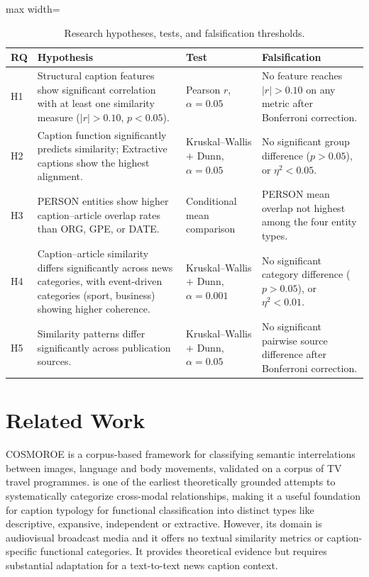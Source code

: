 \documentclass[11pt,a4paper]{article}
\begin{document}
\begin{table}[h]
\centering
\caption{Research hypotheses, tests, and falsification thresholds.}
\label{tab:hypotheses}
\small
\begin{adjustbox}{max width=\linewidth}
\begin{tabular}{@{}lp{5.5cm}p{3.2cm}p{3.2cm}@{}}
\toprule
\textbf{RQ} & \textbf{Hypothesis} & \textbf{Test} & \textbf{Falsification}\\
\midrule
H1 & Structural caption features show significant correlation with at least
     one similarity measure ($|r| > 0.10$, $p < 0.05$).
   & Pearson $r$, $\alpha = 0.05$
   & No feature reaches $|r| > 0.10$ on any metric after Bonferroni correction.\\
\addlinespace
H2 & Caption function significantly predicts similarity; Extractive captions
     show the highest alignment.
   & Kruskal--Wallis $+$ Dunn, $\alpha = 0.05$
   & No significant group difference ($p > 0.05$), or $\eta^2 < 0.05$.\\
\addlinespace
H3 & PERSON entities show higher caption--article overlap rates than ORG,
     GPE, or DATE.
   & Conditional mean comparison
   & PERSON mean overlap not highest among the four entity types.\\
\addlinespace
H4 & Caption--article similarity differs significantly across news categories,
     with event-driven categories (sport, business) showing higher coherence.
   & Kruskal--Wallis $+$ Dunn, $\alpha = 0.001$
   & No significant category difference ($p > 0.05$), or $\eta^2 < 0.01$.\\
\addlinespace
H5 & Similarity patterns differ significantly across publication sources.
   & Kruskal--Wallis $+$ Dunn, $\alpha = 0.05$
   & No significant pairwise source difference after Bonferroni correction.\\
\bottomrule
\end{tabular}
\end{adjustbox}
\end{table}

\section{Related Work}

COSMOROE is a corpus-based framework for classifying semantic interrelations
between images, language and body movements, validated on a corpus of TV
travel programmes. \cite{pastra2008} is one of the earliest theoretically
grounded attempts to systematically categorize cross-modal relationships,
making it a useful foundation for caption typology for functional
classification into distinct types like descriptive, expansive, independent or
extractive. However, its domain is audiovisual broadcast media and it offers
no textual similarity metrics or caption-specific functional categories. It
provides theoretical evidence but requires substantial adaptation for a
text-to-text news caption context.
\end{document}
